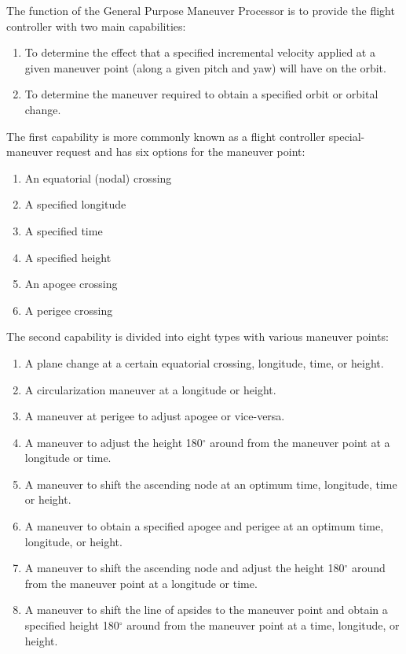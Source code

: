 \documentclass[11pt]{article} %
\begin{document}
The function of the General Purpose Maneuver Processor is to provide the flight controller with two main capabilities:

\begin{enumerate}
	\item To determine the effect that a specified incremental velocity applied at a given maneuver point (along a given pitch and yaw) will have on the orbit.
	\item To determine the maneuver required to obtain a specified orbit or orbital change.
\end{enumerate}

The first capability is more commonly known as a flight controller special-maneuver request and has six options for the maneuver point:

\begin{enumerate}
	\item An equatorial (nodal) crossing
	\item A specified longitude
	\item A specified time
	\item A specified height
	\item An apogee crossing
	\item A perigee crossing
\end{enumerate}

The second capability is divided into eight types with various maneuver points:

\begin{enumerate}
	\item A plane change at a certain equatorial crossing, longitude, time, or height.
	\item A circularization maneuver at a longitude or height.
	\item A maneuver at perigee to adjust apogee or vice-versa.
	\item A maneuver to adjust the height 180$^{\circ}$ around from the maneuver point at a longitude or time.
	\item A maneuver to shift the ascending node at an optimum time, longitude, time or height.
	\item A maneuver to obtain a specified apogee and perigee at an optimum time, longitude, or height.
	\item A maneuver to shift the ascending node and adjust the height 180$^{\circ}$ around from the maneuver point at a longitude or time.
\item A maneuver to shift the line of apsides to the maneuver point and obtain a specified height 180$^{\circ}$ around from the maneuver point at a time, longitude, or height.
\end{enumerate}
\end{document}
